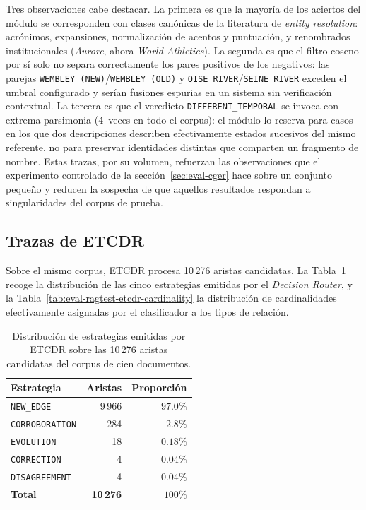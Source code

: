 Tres observaciones cabe destacar. La primera es que la mayoría de los aciertos del módulo se corresponden con clases canónicas de la literatura de \emph{entity resolution}: acrónimos, expansiones, normalización de acentos y puntuación, y renombrados institucionales (\emph{Aurore}, ahora \emph{World Athletics}). La segunda es que el filtro coseno por sí solo no separa correctamente los pares positivos de los negativos: las parejas \texttt{WEMBLEY (NEW)}/\texttt{WEMBLEY (OLD)} y \texttt{OISE RIVER}/\texttt{SEINE RIVER} exceden el umbral configurado y serían fusiones espurias en un sistema sin verificación contextual. La tercera es que el veredicto \texttt{DIFFERENT\_TEMPORAL} se invoca con extrema parsimonia (4~veces en todo el corpus): el módulo lo reserva para casos en los que dos descripciones describen efectivamente estados sucesivos del mismo referente, no para preservar identidades distintas que comparten un fragmento de nombre. Estas trazas, por su volumen, refuerzan las observaciones que el experimento controlado de la sección~\ref{sec:eval-cger} hace sobre un conjunto pequeño y reducen la sospecha de que aquellos resultados respondan a singularidades del corpus de prueba.

\subsection{Trazas de ETCDR}

Sobre el mismo corpus, ETCDR procesa 10\,276 aristas candidatas. La Tabla~\ref{tab:eval-ragtest-etcdr-strategies} recoge la distribución de las cinco estrategias emitidas por el \emph{Decision Router}, y la Tabla~\ref{tab:eval-ragtest-etcdr-cardinality} la distribución de cardinalidades efectivamente asignadas por el clasificador a los tipos de relación.

\begin{table}[h]
\centering
\small
\begin{tabular}{lrr}
\hline
\textbf{Estrategia} & \textbf{Aristas} & \textbf{Proporción} \\ \hline
\texttt{NEW\_EDGE}      & 9\,966 & $97.0\%$ \\
\texttt{CORROBORATION}  &   284  & $2.8\%$ \\
\texttt{EVOLUTION}      &    18  & $0.18\%$ \\
\texttt{CORRECTION}     &     4  & $0.04\%$ \\
\texttt{DISAGREEMENT}   &     4  & $0.04\%$ \\ \hline
\textbf{Total} & \textbf{10\,276} & \textbf{$100\%$} \\ \hline
\end{tabular}
\caption{Distribución de estrategias emitidas por ETCDR sobre las 10\,276 aristas candidatas del corpus de cien documentos.}
\label{tab:eval-ragtest-etcdr-strategies}
\end{table}

